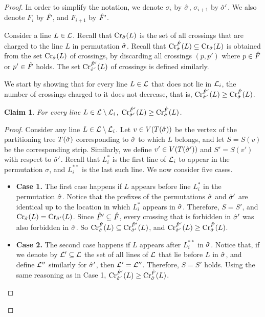 \documentclass[11pt]{article}
\numberwithin{equation}{section}
\newtheorem{claim}[theorem]{Claim}
\theoremstyle{definition}
\theoremstyle{plain}
\begin{document}
\begin{proof}
	In order to simplify the notation, we denote $\sigma_i$ by $\hat{\sigma}$, $\sigma_{i+1}$ by $\hat{\sigma}'$. We also denote $F_i$ by $\hat F$, and $F_{i+1}$ by $\hat F'$.
	
	
	Consider a line $L\in {\mathcal L}$. Recall that $\operatorname{Cr}_{\hat{\sigma}}(L)$ is the set of all crossings that are charged to the line $L$ in permutation $\hat{\sigma}$. Recall that $\operatorname{Cr}^{\hat F}_{\hat{\sigma}}(L)\subseteq \operatorname{Cr}_{\hat{\sigma}}(L)$ is obtained from the set  $\operatorname{Cr}_{\hat{\sigma}}(L)$ of crossings, by discarding all crossings $(p,p')$ where $p\in \hat F$ or $p'\in \hat F$ holds. The set $\operatorname{Cr}^{\hat F'}_{\hat{\sigma}'}(L)$ of crossings is defined similarly.
	
	We start by showing that for every line $L\in {\mathcal L}$ that does not lie in ${\mathcal L}_i$, the number of crossings charged to it does not decrease, that is, $\operatorname{Cr}^{\hat F'}_{\hat{\sigma}'}(L)\geq\operatorname{Cr}^{\hat F}_{\hat{\sigma}}(L)$.
	
	\begin{claim}\label{claim: lines outside of block do not change}
		For every line $L\in {\mathcal L}\setminus {\mathcal L}_i$, $\operatorname{Cr}^{\hat F'}_{\hat{\sigma}'}(L)\geq\operatorname{Cr}^{\hat F}_{\hat{\sigma}}(L)$.
	\end{claim}
	\begin{proof}
		Consider any line $L\in {\mathcal L}\setminus {\mathcal L}_i$. Let $v\in V(T({\hat{\sigma}}))$ be the vertex of the partitioning tree $T({\hat{\sigma}})$ corresponding to $\hat{\sigma}$ to which $L$ belongs, and let $S=S(v)$ be the corresponding strip. Similarly, we define $v'\in V(T({\hat{\sigma}'}))$ and $S'=S(v')$ with respect to $\hat{\sigma}'$.  
		Recall that $L^*_i$ is the first line of ${\mathcal L}_i$ to appear in the permutation $\sigma$, and $L^{**}_i$ is the last such line. We now consider five cases.
		\begin{itemize}
		    \item 	{\bf Case 1.}	The first case happens if $L$ appears before line $L^*_i$ in the permutation $\hat{\sigma}$. Notice that the prefixes of the permutations $\hat{\sigma}$ and $\hat{\sigma}'$ are identical up to the location in which $L^*_i$ appears in $\hat{\sigma}$. Therefore, $S=S'$, and $\operatorname{Cr}_{\hat{\sigma}}(L)=\operatorname{Cr}_{\hat{\sigma}'}(L)$. Since $\hat F'\subseteq \hat F$, every crossing that is forbidden in $\hat{\sigma}'$ was also forbidden in $\hat{\sigma}$. So $\operatorname{Cr}_{\hat{\sigma}}^{\hat F}(L)\subseteq \operatorname{Cr}_{\hat{\sigma}'}^{\hat F'}(L)$, and $\operatorname{Cr}^{\hat F'}_{\hat{\sigma}'}(L)\geq\operatorname{Cr}^{\hat F}_{\hat{\sigma}}(L)$.
		    
		    \item 	{\bf Case 2.} The second case happens if $L$ appears after $L^{**}_i$ in $\hat{\sigma}$. Notice that, if we denote by ${\mathcal L}'\subseteq {\mathcal L}$ the set of all lines of ${\mathcal L}$ that lie before $L$ in $\hat{\sigma}$, and define ${\mathcal L}''$ similarly for $\hat{\sigma}'$, then $ {\mathcal L}'={\mathcal L}''$. Therefore, $S=S'$ holds. Using the same reasoning as in Case 1,  $\operatorname{Cr}^{\hat F'}_{\hat{\sigma}'}(L)\geq\operatorname{Cr}^{\hat F}_{\hat{\sigma}}(L)$.
		    

\end{itemize}
\end{proof}
\end{proof}
\end{document}
